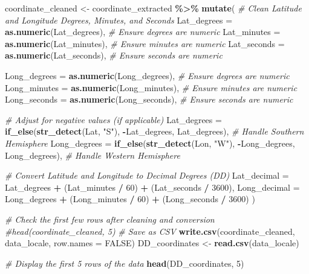 \documentclass[
]{article}
\newenvironment{Shaded}{\begin{snugshade}}{\end{snugshade}}
\newcommand{\AttributeTok}[1]{\textcolor[rgb]{0.13,0.29,0.53}{#1}}
\newcommand{\CommentTok}[1]{\textcolor[rgb]{0.56,0.35,0.01}{\textit{#1}}}
\newcommand{\ConstantTok}[1]{\textcolor[rgb]{0.56,0.35,0.01}{#1}}
\newcommand{\DecValTok}[1]{\textcolor[rgb]{0.00,0.00,0.81}{#1}}
\newcommand{\FunctionTok}[1]{\textcolor[rgb]{0.13,0.29,0.53}{\textbf{#1}}}
\newcommand{\NormalTok}[1]{#1}
\newcommand{\OtherTok}[1]{\textcolor[rgb]{0.56,0.35,0.01}{#1}}
\newcommand{\SpecialCharTok}[1]{\textcolor[rgb]{0.81,0.36,0.00}{\textbf{#1}}}
\newcommand{\StringTok}[1]{\textcolor[rgb]{0.31,0.60,0.02}{#1}}
\begin{document}
\begin{Shaded}
\begin{Highlighting}[]
\NormalTok{coordinate\_cleaned }\OtherTok{\textless{}{-}}\NormalTok{ coordinate\_extracted }\SpecialCharTok{\%\textgreater{}\%}
  \FunctionTok{mutate}\NormalTok{(}
    \CommentTok{\# Clean Latitude and Longitude Degrees, Minutes, and Seconds}
    \AttributeTok{Lat\_degrees =} \FunctionTok{as.numeric}\NormalTok{(Lat\_degrees),  }\CommentTok{\# Ensure degrees are numeric}
    \AttributeTok{Lat\_minutes =} \FunctionTok{as.numeric}\NormalTok{(Lat\_minutes),  }\CommentTok{\# Ensure minutes are numeric}
    \AttributeTok{Lat\_seconds =} \FunctionTok{as.numeric}\NormalTok{(Lat\_seconds),  }\CommentTok{\# Ensure seconds are numeric}
    
    \AttributeTok{Long\_degrees =} \FunctionTok{as.numeric}\NormalTok{(Long\_degrees),  }\CommentTok{\# Ensure degrees are numeric}
    \AttributeTok{Long\_minutes =} \FunctionTok{as.numeric}\NormalTok{(Long\_minutes),  }\CommentTok{\# Ensure minutes are numeric}
    \AttributeTok{Long\_seconds =} \FunctionTok{as.numeric}\NormalTok{(Long\_seconds),  }\CommentTok{\# Ensure seconds are numeric}
    
    \CommentTok{\# Adjust for negative values (if applicable)}
    \AttributeTok{Lat\_degrees =} \FunctionTok{if\_else}\NormalTok{(}\FunctionTok{str\_detect}\NormalTok{(Lat, }\StringTok{"S"}\NormalTok{), }\SpecialCharTok{{-}}\NormalTok{Lat\_degrees, Lat\_degrees),  }\CommentTok{\# Handle Southern Hemisphere}
    \AttributeTok{Long\_degrees =} \FunctionTok{if\_else}\NormalTok{(}\FunctionTok{str\_detect}\NormalTok{(Lon, }\StringTok{"W"}\NormalTok{), }\SpecialCharTok{{-}}\NormalTok{Long\_degrees, Long\_degrees),  }\CommentTok{\# Handle Western Hemisphere}
    
    \CommentTok{\# Convert Latitude and Longitude to Decimal Degrees (DD)}
    \AttributeTok{Lat\_decimal =}\NormalTok{ Lat\_degrees }\SpecialCharTok{+}\NormalTok{ (Lat\_minutes }\SpecialCharTok{/} \DecValTok{60}\NormalTok{) }\SpecialCharTok{+}\NormalTok{ (Lat\_seconds }\SpecialCharTok{/} \DecValTok{3600}\NormalTok{),}
    \AttributeTok{Long\_decimal =}\NormalTok{ Long\_degrees }\SpecialCharTok{+}\NormalTok{ (Long\_minutes }\SpecialCharTok{/} \DecValTok{60}\NormalTok{) }\SpecialCharTok{+}\NormalTok{ (Long\_seconds }\SpecialCharTok{/} \DecValTok{3600}\NormalTok{)}
\NormalTok{  )}

\CommentTok{\# Check the first few rows after cleaning and conversion}
\CommentTok{\#head(coordinate\_cleaned, 5)}
\CommentTok{\# Save as CSV}
\FunctionTok{write.csv}\NormalTok{(coordinate\_cleaned, data\_locale, }\AttributeTok{row.names =} \ConstantTok{FALSE}\NormalTok{)}
\NormalTok{DD\_coordinates }\OtherTok{\textless{}{-}} \FunctionTok{read.csv}\NormalTok{(data\_locale)}

\CommentTok{\# Display the first 5 rows of the data}
\FunctionTok{head}\NormalTok{(DD\_coordinates, }\DecValTok{5}\NormalTok{)}
\end{Highlighting}
\end{Shaded}
\end{document}
